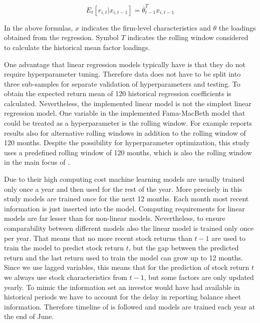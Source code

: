 \documentclass[12pt]{article}
\begin{document}
\begin{equation}
E_t \left[ r_{i, t} | x_{i, t-1} \right] = \overline \theta_{t-1}^T x_{i, t-1}
\end{equation}

In the above formulas, $x$ indicates the firm-level characteristics and $\theta$ the loadings obtained from the regression. Symbol $T$ indicates the rolling window considered to calculate the historical mean factor loadings. \par

One advantage that linear regression models typically have is that they do not require hyperparameter tuning. Therefore data does not have to be split into three sub-samples for separate validation of hyperparameters and testing. To obtain the expected return mean of 120 historical regression coefficients is calculated. Nevertheless, the implemented linear model is not the simplest linear regression model. One variable in the implemented Fama-MacBeth model that could be treated as a hyperparameter is the rolling window. For example \citet{Lewellen2015} reports results also for alternative rolling windows in addition to the rolling window of 120 months. Despite the possibility for hyperparameter optimization, this study uses a predefined rolling window of 120 months, which is also the rolling window in the main focus of \citet{Lewellen2015}. \par

Due to their high computing cost machine learning models are usually trained only once a year and then used for the rest of the year. More precisely in this study models are trained once for the next 12 months. Each month most recent information is just inserted into the model. Computing requirements for linear models are far lesser than for non-linear models. Nevertheless, to ensure comparability between different models also the linear model is trained only once per year. That means that no more recent stock returns than $t-1$ are used to train the model to predict stock return $t$, but the gap between the predicted return and the last return used to train the model can grow up to 12 months. Since we use lagged variables, this means that for the prediction of stock return $t$ we always use stock characteristics from $t-1$, but some factors are only updated yearly. To mimic the information set an investor would have had available in historical periods we have to account for the delay in reporting balance sheet information. Therefore timeline of \citet{FAMA19933} is followed and models are trained each year at the end of June. \par
\end{document}

